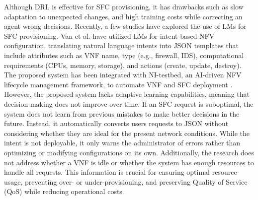 Although DRL is effective for SFC provisioning, it has drawbacks such as  slow adaptation to unexpected changes, and high training costs while correcting an agent wrong decisions. Recently, a few studies have explored the use of LMs for SFC provisioning.
Van et al.\cite{VAN24} have utilized LMs for intent-based NFV configuration, translating natural language intents into JSON templates that include attributes such as VNF name, type (e.g., firewall, IDS), computational requirements (CPUs, memory, storage), and actions (create, update, destroy). The proposed system has been integrated with NI-testbed, an AI-driven NFV lifecycle management framework, to automate VNF and SFC deployment \cite{VAN24}. However, the proposed system lacks adaptive learning capabilities, meaning that decision-making does not improve over time. If an SFC request is suboptimal, the system does not learn from previous mistakes to make better decisions in the future. Instead, it automatically converts users requests to JSON without considering whether they are ideal for the present network conditions. While the intent is not deployable, it only warns the administrator of errors rather than optimizing or modifying configurations on its own.
Additionally, the research does not address whether a VNF is idle or  whether the system has enough resources to handle all requests. This information is crucial for ensuring optimal resource usage, preventing over- or under-provisioning, and preserving Quality of Service (QoS) while reducing operational costs. 



